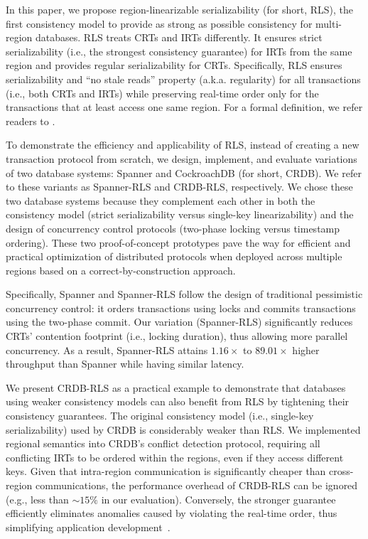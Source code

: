 
In this paper, we propose region-linearizable serializability (for short, RLS), the first consistency model to provide as strong as possible consistency for multi-region databases. RLS treats CRTs and IRTs differently. It ensures strict serializability (i.e., the strongest consistency guarantee) for IRTs from the same region and provides regular serializability for CRTs. Specifically, RLS ensures serializability and ``no stale reads'' property (a.k.a. regularity) for all transactions (i.e., both CRTs and IRTs) while preserving real-time order only for the transactions that at least access one same region. For a formal definition, we refer readers to .



To demonstrate the efficiency and applicability of RLS, instead of creating a new transaction protocol from scratch, we design, implement, and evaluate variations of two database systems: Spanner and CockroachDB (for short, CRDB). We refer to these variants as Spanner-RLS and CRDB-RLS, respectively. We chose these two database systems because they complement each other in both the consistency model (strict serializability versus single-key linearizability) and the design of concurrency control protocols (two-phase locking versus timestamp ordering). These two proof-of-concept prototypes pave the way for efficient and practical optimization of distributed protocols when deployed across multiple regions based on a correct-by-construction approach.

Specifically, Spanner and Spanner-RLS follow the design of traditional pessimistic concurrency control: it orders transactions using locks and commits transactions using the two-phase commit. Our variation (Spanner-RLS) significantly reduces CRTs' contention footprint (i.e., locking duration), thus allowing more parallel concurrency. As a result, Spanner-RLS attains $1.16\times$ to $89.01\times$ higher throughput than Spanner while having similar latency.

We present CRDB-RLS as a practical example to demonstrate that databases using weaker consistency models can also benefit from RLS by tightening their consistency guarantees. 
The original consistency model (i.e., single-key serializability) used by CRDB is considerably weaker than RLS.
We implemented regional semantics into CRDB's conflict detection protocol, requiring all conflicting IRTs to be ordered within the regions, even if they access different keys. Given that intra-region communication is significantly cheaper than cross-region communications, the performance overhead of CRDB-RLS can be ignored (e.g., less than $\sim15\%$ in our evaluation). Conversely, the stronger guarantee efficiently eliminates anomalies caused by violating the real-time order, thus simplifying application development~\cite{spanner:osdi12, lu2023ncc}.

